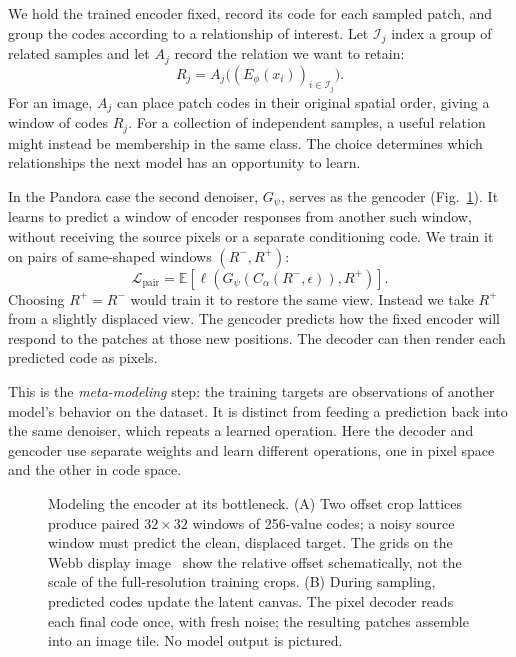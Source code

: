We hold the trained encoder fixed, record its code for each sampled patch, and group the codes according to a relationship of interest. Let $\mathcal I_j$ index a group of related samples and let $A_j$ record the relation we want to retain:
\begin{equation}
 R_j=A_j\bigl((E_\phi(x_i))_{i\in\mathcal I_j}\bigr).
 \label{eq:representation-data}
\end{equation}
For an image, $A_j$ can place patch codes in their original spatial order, giving a window of codes $R_j$. For a collection of independent samples, a useful relation might instead be membership in the same class. The choice determines which relationships the next model has an opportunity to learn.

In the Pandora case the second denoiser, $G_\psi$, serves as the gencoder (Fig.~\ref{fig:representation-model}). It learns to predict a window of encoder responses from another such window, without receiving the source pixels or a separate conditioning code. We train it on pairs of same-shaped windows $(R^-,R^+)$:
\begin{equation}
 \mathcal L_{\mathrm{pair}}=
 \mathbb E\!\left[\ell(G_\psi(C_\alpha(R^-,\epsilon)),R^+)\right].
 \label{eq:family-paired-target}
\end{equation}
Choosing $R^+=R^-$ would train it to restore the same view. Instead we take $R^+$ from a slightly displaced view. The gencoder predicts how the fixed encoder will respond to the patches at those new positions. The decoder can then render each predicted code as pixels.

This is the \emph{meta-modeling} step: the training targets are observations of another model's behavior on the dataset. It is distinct from feeding a prediction back into the same denoiser, which repeats a learned operation. Here the decoder and gencoder use separate weights and learn different operations, one in pixel space and the other in code space.

\begin{figure}[t]
  \centering
  \resizebox{.99\textwidth}{!}{}
  \caption{Modeling the encoder at its bottleneck. (A) Two offset crop lattices produce paired $32\times32$ windows of 256-value codes; a noisy source window must predict the clean, displaced target. The grids on the Webb display image~\cite{webb} show the relative offset schematically, not the scale of the full-resolution training crops. (B) During sampling, predicted codes update the latent canvas. The pixel decoder reads each final code once, with fresh noise; the resulting patches assemble into an image tile. No model output is pictured.}
  \label{fig:representation-model}
\end{figure}
